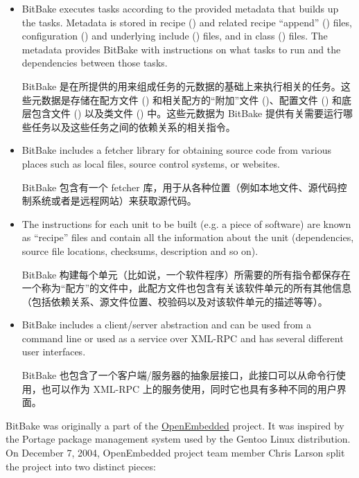 \begin{itemize}
\setlength\itemsep{1.0em}

 \item BitBake executes tasks according to the provided metadata that builds up the tasks. Metadata is stored in recipe () and related recipe ``append'' () files, configuration () and underlying include () files, and in class () files. The metadata provides BitBake with instructions on what tasks to run and the dependencies between those tasks.
 
 \medskip
 BitBake 是在所提供的用来组成任务的元数据的基础上来执行相关的任务。这些元数据是存储在配方文件 () 和相关配方的“附加”文件 ()、配置文件 () 和底层包含文件 () 以及类文件 () 中。这些元数据为 BitBake 提供有关需要运行哪些任务以及这些任务之间的依赖关系的相关指令。

 \item BitBake includes a fetcher library for obtaining source code from various places such as local files, source control systems, or websites.
 
 \medskip
 BitBake 包含有一个 fetcher 库，用于从各种位置（例如本地文件、源代码控制系统或者是远程网站）来获取源代码。

 \item The instructions for each unit to be built (e.g. a piece of software) are known as ``recipe'' files and contain all the information about the unit (dependencies, source file locations, checksums, description and so on).
 
 \medskip
 BitBake 构建每个单元（比如说，一个软件程序）所需要的所有指令都保存在一个称为``配方''的文件中，此配方文件也包含有关该软件单元的所有其他信息（包括依赖关系、源文件位置、校验码以及对该软件单元的描述等等）。

 \item BitBake includes a client/server abstraction and can be used from a command line or used as a service over XML-RPC and has several different user interfaces.
 
 \medskip
 BitBake 也包含了一个客户端/服务器的抽象层接口，此接口可以从命令行使用，也可以作为 XML-RPC 上的服务使用，同时它也具有多种不同的用户界面。

\end{itemize}


BitBake was originally a part of the \href{https://www.openembedded.org/}{OpenEmbedded} project. It was inspired by the Portage package management system used by the Gentoo Linux distribution. On December 7, 2004, OpenEmbedded project team member Chris Larson split the project into two distinct pieces:

